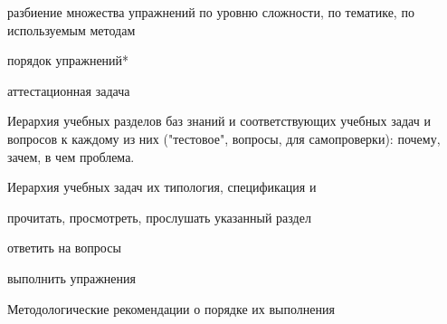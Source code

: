 \begin{SCn}
\end{SCn}

\begin{SCn}
	\begin{scnitemize}
		\item разбиение множества упражнений по уровню сложности, по тематике, по используемым методам
		\item порядок упражнений*
		\item аттестационная задача
	\end{scnitemize}
\end{SCn}

\begin{SCn}
\end{SCn}

Иерархия учебных разделов баз знаний и соответствующих учебных задач и вопросов к каждому из них ("тестовое"{}, вопросы, для самопроверки): почему, зачем, в чем проблема.

Иерархия учебных задач их типология, спецификация и
\begin{textitemize}
	\item прочитать, просмотреть, прослушать указанный раздел
	\item ответить на вопросы
	\item выполнить упражнения
\end{textitemize}

Методологические рекомендации о порядке их выполнения


